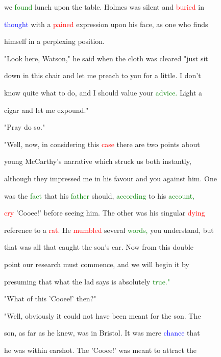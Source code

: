  we \textcolor{green}{found} lunch upon the table. Holmes was silent and \textcolor{red}{buried} in

 \textcolor{blue}{thought} with a \textcolor{red}{pained} expression upon his face, as one who finds

 himself in a perplexing position.



 "Look here, Watson," he said when the cloth was cleared "just sit

 down in this chair and let me preach to you for a little. I don't

 know quite what to do, and I should value your \textcolor{green}{advice.} Light a

 cigar and let me expound."



 \textcolor{BurntOrange}{"Pray} do so."



 "Well, now, in considering this \textcolor{red}{case} there are two points about

 \textcolor{BurntOrange}{young} McCarthy's narrative which struck us both instantly,

 although they impressed me in his favour and you against him. One

 was the \textcolor{green}{fact} that his \textcolor{green}{father} should, \textcolor{green}{according} to his \textcolor{green}{account,}

 \textcolor{red}{cry} 'Cooee!' before seeing him. The other was his singular \textcolor{red}{dying}

 reference to a \textcolor{red}{rat.} He \textcolor{red}{mumbled} several \textcolor{green}{words,} you understand, but

 that was all that caught the son's ear. Now from this double

 point our research must commence, and we will begin it by

 presuming that what the lad says is absolutely \textcolor{green}{true."}



 "What of this 'Cooee!' then?"



 "Well, obviously it could not have been meant for the son. The

 son, as far as he knew, was in Bristol. It was mere \textcolor{blue}{chance} that

 he was within earshot. The 'Cooee!' was meant to attract the


